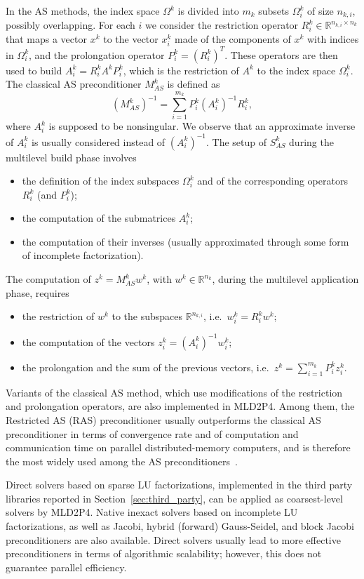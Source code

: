 In the AS methods, the index space $\Omega^k$ is divided into $m_k$
subsets $\Omega^k_i$ of size $n_{k,i}$,  possibly
overlapping. For each $i$ we consider the restriction
operator $R_i^k \in \mathbb{R}^{n_{k,i} \times n_k}$
that maps a vector $x^k$ to the vector $x_i^k$ made of the components of $x^k$
with indices in $\Omega^k_i$, and the prolongation operator
$P^k_i = (R_i^k)^T$. These operators are then  used to build
$A_i^k=R_i^kA^kP_i^k$, which is the restriction of $A^k$ to the index
space $\Omega^k_i$.
The classical AS preconditioner $M^k_{AS}$ is defined as
\[
    ( M^k_{AS} )^{-1} = \sum_{i=1}^{m_k} P_i^k (A_i^k)^{-1} R_i^{k},
\]
where $A_i^k$ is supposed to be nonsingular. We observe that an approximate
inverse of $A_i^k$ is usually considered instead of $(A_i^k)^{-1}$.
The setup of $S^k_{AS}$ during the multilevel build phase
involves
\begin{itemize}
  \item the definition of the index subspaces $\Omega_i^k$ and of the corresponding 
  operators $R_i^k$ (and $P_i^k$);
  \item the computation of the submatrices $A_i^k$;
  \item the computation of their inverses (usually approximated
    through  some form  of incomplete factorization).
\end{itemize}
The computation of $z^k=M^k_{AS}w^k$, with $w^k \in \mathbb{R}^{n_k}$, during the
multilevel application phase, requires
\begin{itemize}
	\item the restriction of $w^k$ to the subspaces $\mathbb{R}^{n_{k,i}}$,
	  i.e.\ $w_i^k = R_i^{k} w^k$;
	\item the computation of the vectors $z_i^k=(A_i^k)^{-1} w_i^k$;
	\item the prolongation and the sum of the previous vectors,
    i.e.\ $z^k = \sum_{i=1}^{m_k} P_i^k z_i^k$.
\end{itemize}
Variants of the classical AS method, which use modifications of the
restriction and prolongation operators, are also implemented in MLD2P4.
Among them, the Restricted AS (RAS) preconditioner usually
outperforms the classical AS preconditioner in terms of convergence
rate and of computation and communication time on parallel distributed-memory
computers, and is therefore the most widely used among the AS
preconditioners~\cite{CAI_SARKIS}. 

Direct solvers based on sparse LU factorizations, implemented in the
third party libraries reported in Section~\ref{sec:third_party}, can be applied
as coarsest-level solvers by MLD2P4. Native inexact solvers based on
incomplete LU factorizations, as well as Jacobi, hybrid (forward) Gauss-Seidel,
and block Jacobi preconditioners are also available. Direct solvers usually
lead to more effective preconditioners in terms of algorithmic scalability;
however, this does not guarantee parallel efficiency.


